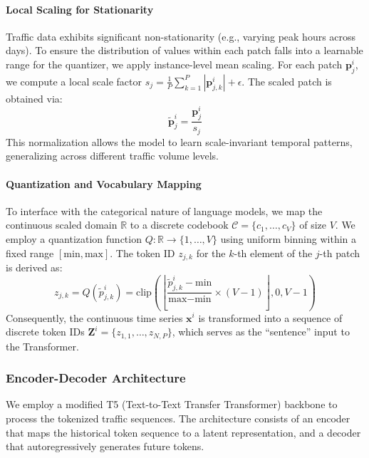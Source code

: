 \documentclass{article}
\begin{document}
\paragraph{Local Scaling for Stationarity}
Traffic data exhibits significant non-stationarity (e.g., varying peak hours across days). To ensure the distribution of values within each patch falls into a learnable range for the quantizer, we apply instance-level mean scaling. For each patch $\mathbf{p}^i_j$, we compute a local scale factor $s_j = \frac{1}{P} \sum_{k=1}^P |\mathbf{p}^i_{j,k}| + \epsilon$. The scaled patch is obtained via:
\begin{equation}
    \tilde{\mathbf{p}}^i_j = \frac{\mathbf{p}^i_j}{s_j}
\end{equation}
This normalization allows the model to learn scale-invariant temporal patterns, generalizing across different traffic volume levels.

\paragraph{Quantization and Vocabulary Mapping}
To interface with the categorical nature of language models, we map the continuous scaled domain $\mathbb{R}$ to a discrete codebook $\mathcal{C} = \{c_1, \dots, c_V\}$ of size $V$. We employ a quantization function $Q: \mathbb{R} \to \{1, \dots, V\}$ using uniform binning within a fixed range $[\text{min}, \text{max}]$. The token ID $z_{j,k}$ for the $k$-th element of the $j$-th patch is derived as:
\begin{equation}
    z_{j,k} = Q(\tilde{p}^i_{j,k}) = \text{clip}\left(\left\lfloor \frac{\tilde{p}^i_{j,k} - \text{min}}{\text{max} - \text{min}} \times (V-1) \right\rfloor, 0, V-1\right)
\end{equation}
Consequently, the continuous time series $\mathbf{x}^i$ is transformed into a sequence of discrete token IDs $\mathbf{Z}^i = \{z_{1,1}, \dots, z_{N,P}\}$, which serves as the ``sentence'' input to the Transformer.

\subsubsection{Encoder-Decoder Architecture}
We employ a modified T5 (Text-to-Text Transfer Transformer) backbone \cite{raffel2020exploring} to process the tokenized traffic sequences. The architecture consists of an encoder that maps the historical token sequence to a latent representation, and a decoder that autoregressively generates future tokens.
\end{document}
